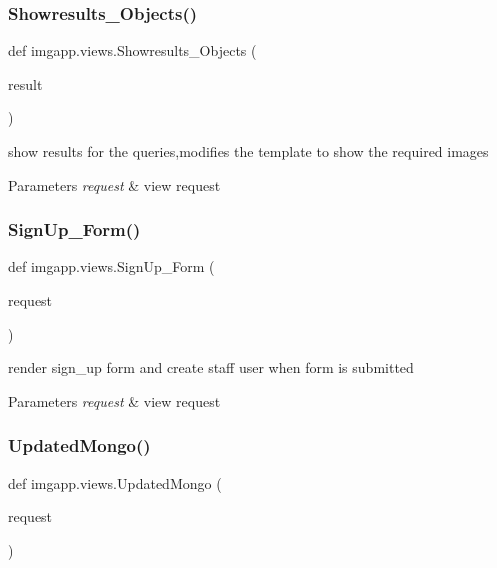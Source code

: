 \subsubsection{\texorpdfstring{Showresults\+\_\+\+Objects()}{Showresults\_Objects()}}
{\footnotesize\ttfamily def imgapp.\+views.\+Showresults\+\_\+\+Objects (\begin{DoxyParamCaption}\item[{}]{result }\end{DoxyParamCaption})}



show results for the queries,modifies the template to show the required images 


\begin{DoxyParams}{Parameters}
{\em request} & view request \\
\hline
\end{DoxyParams}
\mbox{\label{namespaceimgapp_1_1views_a7ff46cd0d8d9cddbd78a488b2e45ce0c}} 
\subsubsection{\texorpdfstring{Sign\+Up\+\_\+\+Form()}{SignUp\_Form()}}
{\footnotesize\ttfamily def imgapp.\+views.\+Sign\+Up\+\_\+\+Form (\begin{DoxyParamCaption}\item[{}]{request }\end{DoxyParamCaption})}



render sign\+\_\+up form and create staff user when form is submitted 


\begin{DoxyParams}{Parameters}
{\em request} & view request \\
\hline
\end{DoxyParams}
\mbox{\label{namespaceimgapp_1_1views_a3e7e98b43ec1f6f0205f62d1ddcc505b}} 
\subsubsection{\texorpdfstring{Updated\+Mongo()}{UpdatedMongo()}}
{\footnotesize\ttfamily def imgapp.\+views.\+Updated\+Mongo (\begin{DoxyParamCaption}\item[{}]{request }\end{DoxyParamCaption})}



